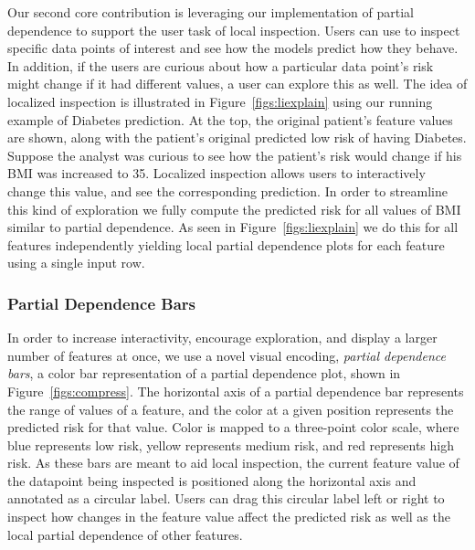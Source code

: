 


Our second core contribution is leveraging our implementation of partial dependence to support the user task of local inspection.  Users can use \prospector to inspect specific data points of interest and see how the models predict how they behave.  In addition, if the users are curious about how a particular data point's risk might change if it had different values, a user can explore this as well.  The idea of localized inspection is illustrated in Figure~\ref{figs:liexplain} using our running example of Diabetes prediction.  At the top, the original patient's feature values are shown, along with the patient's original predicted low risk of having Diabetes. Suppose the analyst was curious to see how the patient's risk would change if his BMI was increased to 35.
Localized inspection allows users to interactively change this value, and see the corresponding prediction.
In order to streamline this kind of exploration we fully compute the
predicted risk for all values of BMI similar to partial dependence.
As seen in Figure~\ref{figs:liexplain} we do this for all features independently
yielding local partial dependence plots for each feature using a single input row.



\subsubsection{Partial Dependence Bars}
In order to increase interactivity, encourage exploration, and display a larger number of features at once, we use a novel visual encoding, \emph{partial dependence bars}, a color bar representation of a partial dependence plot, shown in Figure~\ref{figs:compress}. The horizontal axis of a partial dependence bar represents the range of values of a feature, and the color at a given position represents the predicted risk for that value.  Color is mapped to a three-point color scale, where blue represents low risk, yellow represents medium risk, and red represents high risk.  As these bars are meant to aid local inspection, the current feature value of the datapoint being inspected is positioned along the horizontal axis and annotated as a circular label.  Users can drag this circular label left or right to inspect how changes in the feature value affect the predicted risk as well as the local partial dependence of other features.

